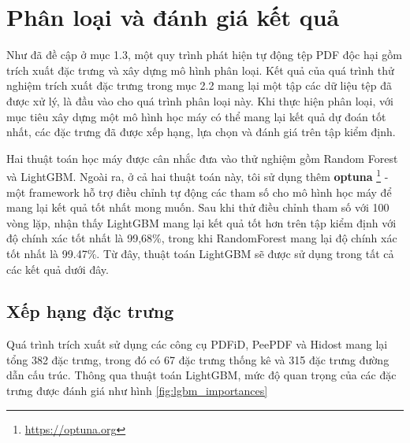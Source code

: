\documentclass[./../main.tex]{subfiles}
\begin{document}
\section{Phân loại và đánh giá kết quả}

Như đã đề cập ở mục 1.3, một quy trình phát hiện tự động tệp PDF độc hại gồm trích xuất đặc trưng và xây dựng mô hình phân loại. Kết quả của quá trình thử nghiệm trích xuất đặc trưng trong mục 2.2 mang lại một tập các dữ liệu tệp đã được xử lý, là đầu vào cho quá trình phân loại này. Khi thực hiện phân loại, với mục tiêu xây dựng một mô hình học máy có thể mang lại kết quả dự đoán tốt nhất, các đặc trưng đã được xếp hạng, lựa chọn và đánh giá trên tập kiểm định.

Hai thuật toán học máy được cân nhắc đưa vào thử nghiệm gồm Random Forest và LightGBM. Ngoài ra, ở cả hai thuật toán này, tôi sử dụng thêm \textbf{optuna} \footnote{\url{https://optuna.org}} - một framework hỗ trợ điều chỉnh tự động các tham số cho mô hình học máy để mang lại kết quả tốt nhất mong muốn. Sau khi thử điều chỉnh tham số với 100 vòng lặp, nhận thấy LightGBM mang lại kết quả tốt hơn trên tập kiểm định với độ chính xác tốt nhất là 99,68\%, trong khi RandomForest mang lại độ chính xác tốt nhất là 99.47\%. Từ đây, thuật toán LightGBM sẽ được sử dụng trong tất cả các kết quả dưới đây.

\subsection{Xếp hạng đặc trưng}
Quá trình trích xuất sử dụng các công cụ PDFiD, PeePDF và Hidost mang lại tổng 382 đặc trưng, trong đó có 67 đặc trưng thống kê và 315 đặc trưng đường dẫn cấu trúc. Thông qua thuật toán LightGBM, mức độ quan trọng của các đặc trưng được đánh giá như hình \ref{fig:lgbm_importances}
\end{document}
